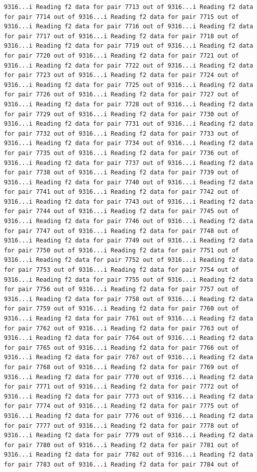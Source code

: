 \documentclass[
]{article}
\begin{document}
\begin{verbatim}
9316...i Reading f2 data for pair 7713 out of 9316...i Reading f2 data for pair 7714 out of 9316...i Reading f2 data for pair 7715 out of 9316...i Reading f2 data for pair 7716 out of 9316...i Reading f2 data for pair 7717 out of 9316...i Reading f2 data for pair 7718 out of 9316...i Reading f2 data for pair 7719 out of 9316...i Reading f2 data for pair 7720 out of 9316...i Reading f2 data for pair 7721 out of 9316...i Reading f2 data for pair 7722 out of 9316...i Reading f2 data for pair 7723 out of 9316...i Reading f2 data for pair 7724 out of 9316...i Reading f2 data for pair 7725 out of 9316...i Reading f2 data for pair 7726 out of 9316...i Reading f2 data for pair 7727 out of 9316...i Reading f2 data for pair 7728 out of 9316...i Reading f2 data for pair 7729 out of 9316...i Reading f2 data for pair 7730 out of 9316...i Reading f2 data for pair 7731 out of 9316...i Reading f2 data for pair 7732 out of 9316...i Reading f2 data for pair 7733 out of 9316...i Reading f2 data for pair 7734 out of 9316...i Reading f2 data for pair 7735 out of 9316...i Reading f2 data for pair 7736 out of 9316...i Reading f2 data for pair 7737 out of 9316...i Reading f2 data for pair 7738 out of 9316...i Reading f2 data for pair 7739 out of 9316...i Reading f2 data for pair 7740 out of 9316...i Reading f2 data for pair 7741 out of 9316...i Reading f2 data for pair 7742 out of 9316...i Reading f2 data for pair 7743 out of 9316...i Reading f2 data for pair 7744 out of 9316...i Reading f2 data for pair 7745 out of 9316...i Reading f2 data for pair 7746 out of 9316...i Reading f2 data for pair 7747 out of 9316...i Reading f2 data for pair 7748 out of 9316...i Reading f2 data for pair 7749 out of 9316...i Reading f2 data for pair 7750 out of 9316...i Reading f2 data for pair 7751 out of 9316...i Reading f2 data for pair 7752 out of 9316...i Reading f2 data for pair 7753 out of 9316...i Reading f2 data for pair 7754 out of 9316...i Reading f2 data for pair 7755 out of 9316...i Reading f2 data for pair 7756 out of 9316...i Reading f2 data for pair 7757 out of 9316...i Reading f2 data for pair 7758 out of 9316...i Reading f2 data for pair 7759 out of 9316...i Reading f2 data for pair 7760 out of 9316...i Reading f2 data for pair 7761 out of 9316...i Reading f2 data for pair 7762 out of 9316...i Reading f2 data for pair 7763 out of 9316...i Reading f2 data for pair 7764 out of 9316...i Reading f2 data for pair 7765 out of 9316...i Reading f2 data for pair 7766 out of 9316...i Reading f2 data for pair 7767 out of 9316...i Reading f2 data for pair 7768 out of 9316...i Reading f2 data for pair 7769 out of 9316...i Reading f2 data for pair 7770 out of 9316...i Reading f2 data for pair 7771 out of 9316...i Reading f2 data for pair 7772 out of 9316...i Reading f2 data for pair 7773 out of 9316...i Reading f2 data for pair 7774 out of 9316...i Reading f2 data for pair 7775 out of 9316...i Reading f2 data for pair 7776 out of 9316...i Reading f2 data for pair 7777 out of 9316...i Reading f2 data for pair 7778 out of 9316...i Reading f2 data for pair 7779 out of 9316...i Reading f2 data for pair 7780 out of 9316...i Reading f2 data for pair 7781 out of 9316...i Reading f2 data for pair 7782 out of 9316...i Reading f2 data for pair 7783 out of 9316...i Reading f2 data for pair 7784 out of 
\end{verbatim}
\end{document}

